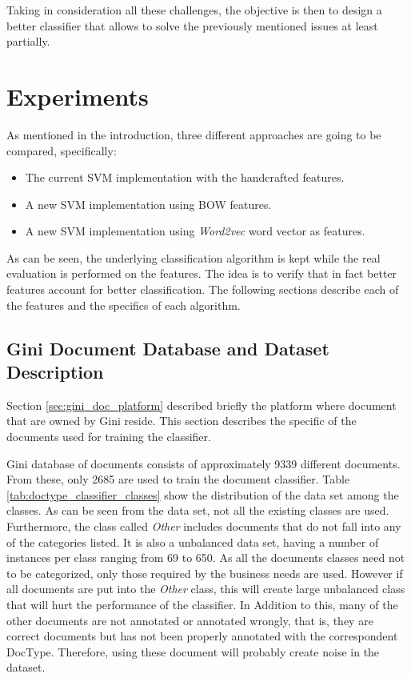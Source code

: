Taking in consideration all these challenges, the objective is then to design
a better classifier that allows to solve the previously mentioned issues at least partially.



\section{Experiments}
\label{sec:w2vec_doctype_experimental_setup}

As mentioned in the introduction, three different approaches are going to be
compared, specifically:

\begin{itemize}
\item The current \ac{SVM} implementation with the handcrafted features.
\item A new \ac{SVM} implementation using \ac{BOW} features.
\item A new \ac{SVM} implementation using \textit{Word2vec} word vector as features.
\end{itemize}

As can be seen, the underlying classification algorithm is kept while the
 real evaluation is performed on  the features. The idea  is to verify
that in fact better features account for better classification. The following
sections describe each of the features and the specifics of each algorithm. 


\subsection{Gini Document Database and Dataset Description}
\label{sec:gini_db_dataset_desc}
  
Section \ref{sec:gini_doc_platform} described briefly the platform where
document that are owned by Gini reside. This section describes the specific of the
documents used for training the classifier. 

Gini database of documents consists of approximately 9339 different documents. From these, only 2685 are used to train the document classifier.
Table \ref{tab:doctype_classifier_classes} show the distribution of the data
set among the classes. As can be seen from the data set, not all the existing
classes are used. Furthermore, the class called \textit{Other} includes
documents that do not fall into any of the categories listed. It is also a
unbalanced data set, having a number of instances per class ranging from 69
to 650. As all the documents classes need not to be categorized,  only those
required by the business needs are used. However if all documents are put
into the \textit{Other} class, this will create large unbalanced class that
will hurt the performance of the classifier. In Addition to this, many of the
other documents are not annotated or annotated wrongly, that is, they are correct documents but has
not been properly annotated with the correspondent \ac{DocType}. Therefore,
using these document will probably create noise in the dataset.


